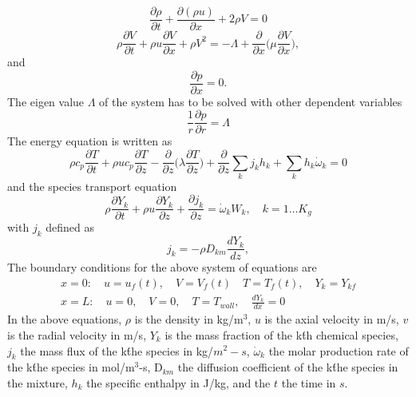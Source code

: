 \begin{equation}
\frac{\partial \rho}{\partial t} + \frac{\partial (\rho u)}{\partial x} + 2\rho V = 0
\end{equation}
\begin{equation}
 \rho \frac{\partial V}{\partial t} + \rho u \frac{\partial V}{\partial x} + \rho V^2 = -\Lambda + \frac{\partial }{\partial x}\bigg(\mu \frac{\partial V}{\partial x} \bigg),
\end{equation}
and
\begin{equation}
 \frac{\partial p}{\partial x} = 0.
\end{equation}
The eigen value $\Lambda$ of the system has to be solved with other dependent variables
\begin{equation}
 \frac{1}{r}\frac{\partial p}{\partial r} = \Lambda
\end{equation}
The energy equation is written as
\begin{equation}
 \rho c_p \frac{\partial T}{\partial t}+ \rho u c_p \frac{\partial T}{\partial z} - \frac{\partial }{\partial z}\bigg(\lambda \frac{\partial T}{\partial z} \bigg) + \frac{\partial}{\partial z} \sum_k j_k h_{k}  + \sum_k h_k\dot{\omega}_k = 0
\end{equation}
and the species transport equation
\begin{equation}
 \rho \frac{\partial Y_k}{\partial t}+ \rho u \frac{\partial Y_k}{\partial z} + \frac{\partial j_k}{\partial z} = \dot{\omega}_k W_k, \quad k=1\ldots K_g
\end{equation}
with $j_k$ defined as
\begin{equation}
 j_k = -\rho D_{km} \frac{dY_k}{dz},
\end{equation}
The boundary conditions for the above system of equations are 
\begin{eqnarray}
 x = 0: \quad u=u_f(t), \quad V = V_f(t) \quad T=T_f(t), \quad Y_k = Y_{kf} \nonumber \\
x=L: \quad u=0, \quad V=0, \quad T=T_{wall}, \quad \frac{dY_k}{dx}=0
\end{eqnarray}
In the above equations, $\rho$ is the density in kg/m$^3$, $u$ is the axial velocity in m/s, $v$ is the radial velocity in m/s,  $Y_k$ is the mass fraction of the k\'th chemical species, $j_k$ the mass flux of the k\'the species in kg/$m^2-s$, $\dot{\omega}_k$ the molar production rate of the k\'the species in mol/m$^3$-s, D$_{km}$ the diffusion coefficient of the k\'the species in the mixture, $h_k$ the specific enthalpy in J/kg, and the $t$ the time in $s$.

